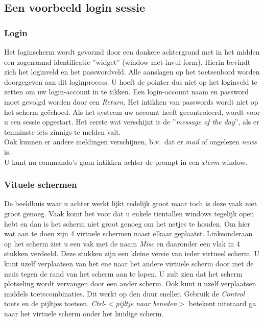 \subsection{Een voorbeeld login sessie}
\label{Een voorbeeld login sessie}
\subsubsection{Login}
\label{Login}

Het loginscherm wordt gevormd door een donkere achtergrond met in het
midden een zogenaamd identificatie ''widget'' (window met invul-form).
Hierin bevindt zich het loginveld en het passwordveld.
Alle aanslagen op het toetsenbord worden doorgegeven aan dit loginprocess.
U hoeft de pointer dus niet op het loginveld te zetten om uw
login-account in te tikken.
Een login-account naam en password moet gevolgd worden door een {\em Return}.
Het intikken van passwords wordt niet op het scherm ge\"echoed.
\newline
Als het systeem uw account heeft gecontroleerd,
wordt voor u een sessie opgestart.
Het eerste wat verschijnt is de ''{\em message of the day}'',
als er tenminste iets zinnigs te melden valt.\\
Ook kunnen er andere meldingen verschijnen,
b.v.\ dat er {\em mail} of ongelezen {\em news} is.\\
U kunt nu commando's gaan intikken achter de prompt in een {\em xterm}-window.

\subsubsection{Vituele schermen}
\label{Vituele schermen}

De beeldbuis waar u achter werkt lijkt redelijk groot maar toch is
deze vaak niet groot genoeg.
Vaak komt het voor dat u enkele tientallen windows tegelijk open hebt
en dan is het scherm niet groot genoeg om het netjes te houden.
Om hier wat aan te doen zijn 4 virtuele schermen naast elkaar geplaatst.
Linksonderaan op het scherm ziet u een vak met
de naam {\em Misc} en daaronder een vlak in 4 stukken verdeeld.
Deze stukken zijn een kleine versie van ieder virtueel scherm.
\newline
U kunt uzelf verplaatsen van het ene naar het andere virtuele scherm
door met de muis tegen de rand van het scherm aan te lopen.
U zult zien dat het scherm plotseling wordt vervangen door een ander scherm.
Ook kunt u uzelf verplaatsen middels toetscombinaties.
Dit werkt op den duur sneller.
Gebruik de {\em Control} toets en de pijltjes toetsen.
{\em Ctrl-$<$pijltje naar beneden$>$} betekent uiteraard ga naar
het virtuele scherm onder het huidige scherm.

